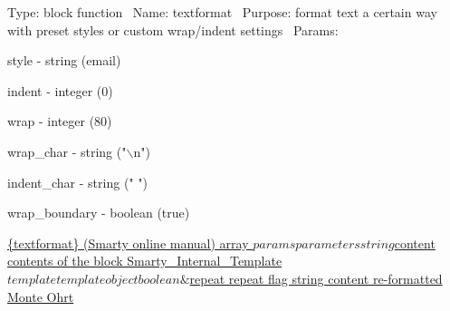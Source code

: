 Type\+: block function~\newline
 Name\+: textformat~\newline
 Purpose\+: format text a certain way with preset styles or custom wrap/indent settings~\newline
 Params\+: 
\begin{DoxyPre}
\begin{DoxyItemize}
\item style         - string (email)
\item indent        - integer (0)
\item wrap          - integer (80)
\item wrap\_char     - string ("\(\backslash\)n")
\item indent\_char   - string (" ")
\item wrap\_boundary - boolean (true)

\end{DoxyItemize}\end{DoxyPre}



\begin{DoxyPre}\hyperlink{}{\{textformat\}
      (Smarty online manual)
 array                    $params   parameters
 string                   $content  contents of the block
 Smarty\_Internal\_Template $template template object
 boolean                  \&$repeat  repeat flag
 string content re-formatted
 Monte Ohrt }
\end{DoxyPre}
